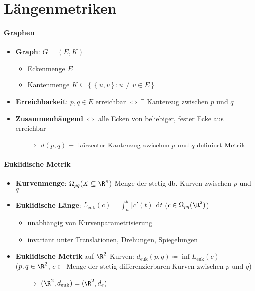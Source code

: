 \section{Längenmetriken}

\paragraph{Graphen}
\begin{itemize}
  \item \textbf{Graph}: \( G = (E,K) \) 
  \begin{itemize}
    \item Eckenmenge \( E \)
    \item Kantenmenge \( K \subseteq \left \{ \left \{ u,v \right \} : u \neq v \in E \right \} \)
  \end{itemize}
  \item \textbf{Erreichbarkeit}: \( p,q \in E \) erreichbar \( \Leftrightarrow \ \exists \) Kantenzug zwischen \( p \) und \( q \)
  \item \textbf{Zusammenhängend} \( \Leftrightarrow \) alle Ecken von beliebiger, fester Ecke aus erreichbar
  \begin{itemize}
    \item[\( \to \)] \( d(p,q) = \) kürzester Kantenzug zwischen \( p \) und \( q \) definiert Metrik
  \end{itemize}
\end{itemize}

\paragraph{Euklidische Metrik}
\begin{itemize}
  \item \textbf{Kurvenmenge}: \( \Omega_{pq}(X \subseteq \R^n) \) Menge der stetig db. Kurven zwischen \( p \) und \( q \)
  \item \textbf{Euklidische Länge}: \( L_{\text{euk}}(c) = \int_a^b \left\Vert c'(t) \right\Vert \text{d}t \) (\( c \in \Omega_{pq}(\R^2) \))
  \begin{itemize}
    \item unabhängig von Kurvenparametrisierung
    \item invariant unter Translationen, Drehungen, Spiegelungen
  \end{itemize}
  \item \textbf{Euklidische Metrik} auf \( \R^2 \)-Kurven: \( d_\text{euk}(p,q) \coloneqq \inf L_{\text{euk}}(c) \) \\
  (\( p,q \in \R^2 \), \( c \in \) Menge der stetig differenzierbaren Kurven zwischen \( p \) und \( q \))
  \begin{itemize}
    \item[\( \to \)] \( (\R^2, d_{\text{euk}}) = (\R^2, d_e) \)
  \end{itemize}
\end{itemize}

